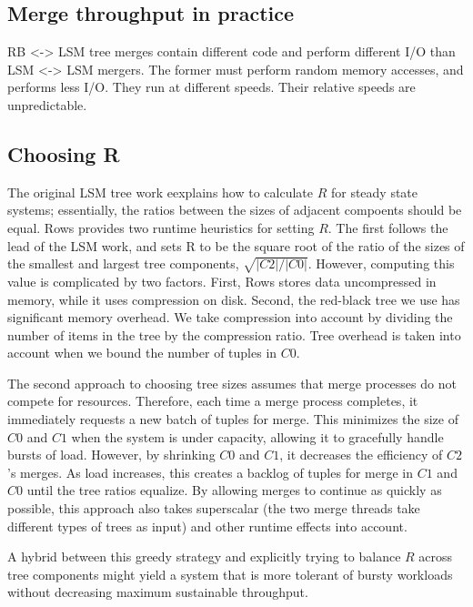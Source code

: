 \documentclass{sig-alternate-sigmod08}
\newcommand{\rows}{Rows\xspace}
\begin{document}
\subsection{Merge throughput in practice}

RB <-> LSM tree merges contain different code and perform different
I/O than LSM <-> LSM mergers.  The former must perform random memory
accesses, and performs less I/O.  They run at different speeds.  Their
relative speeds are unpredictable.

\subsection{Choosing R}

The original LSM tree work eexplains how to calculate $R$ for steady
state systems; essentially, the ratios between the sizes of adjacent
compoents should be equal.  \rows provides two runtime heuristics for
setting $R$.  The first follows the lead of the LSM work, and sets R
to be the square root of the ratio of the sizes of the smallest and
largest tree components, $\sqrt{|C2|/|C0|}$.  However, computing this
value is complicated by two factors.  First, \rows stores data
uncompressed in memory, while it uses compression on disk.  Second,
the red-black tree we use has significant memory overhead.  We take
compression into account by dividing the number of items in the tree
by the compression ratio.  Tree overhead is taken into account when we
bound the number of tuples in $C0$.

The second approach to choosing tree sizes assumes that merge
processes do not compete for resources.  Therefore, each time a merge
process completes, it immediately requests a new batch of tuples for
merge.  This minimizes the size of $C0$ and $C1$ when the system is
under capacity, allowing it to gracefully handle bursts of load.
However, by shrinking $C0$ and $C1$, it decreases the efficiency of
$C2$'s merges.  As load increases, this creates a backlog of tuples
for merge in $C1$ and $C0$ until the tree ratios equalize.  By
allowing merges to continue as quickly as possible, this approach also
takes superscalar (the two merge threads take different types of trees
as input) and other runtime effects into account.

A hybrid between this greedy strategy and explicitly trying to balance
$R$ across tree components might yield a system that is more tolerant
of bursty workloads without decreasing maximum sustainable throughput.
\end{document}
